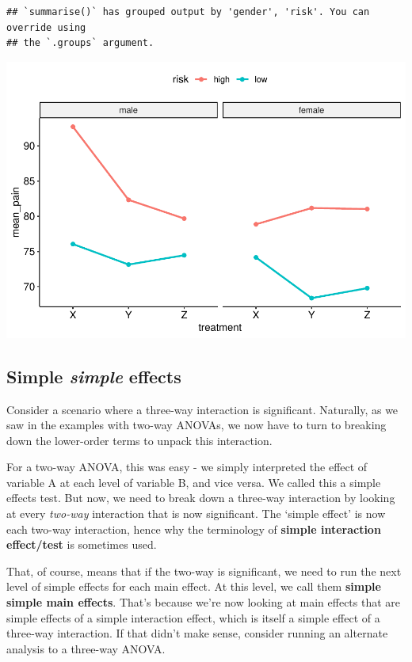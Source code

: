 \documentclass[
]{book}
\begin{document}
\begin{verbatim}
## `summarise()` has grouped output by 'gender', 'risk'. You can override using
## the `.groups` argument.
\end{verbatim}

\includegraphics{_main_files/figure-latex/unnamed-chunk-249-1.pdf}

\hypertarget{simple-simple-effects}{%
\subsection{\texorpdfstring{Simple \emph{simple} effects}{Simple simple effects}}\label{simple-simple-effects}}

Consider a scenario where a three-way interaction is significant. Naturally, as we saw in the examples with two-way ANOVAs, we now have to turn to breaking down the lower-order terms to unpack this interaction.

For a two-way ANOVA, this was easy - we simply interpreted the effect of variable A at each level of variable B, and vice versa. We called this a simple effects test. But now, we need to break down a three-way interaction by looking at every \emph{two-way} interaction that is now significant. The `simple effect' is now each two-way interaction, hence why the terminology of \textbf{simple interaction effect/test} is sometimes used.

That, of course, means that if the two-way is significant, we need to run the next level of simple effects for each main effect. At this level, we call them \textbf{simple simple main effects}. That's because we're now looking at main effects that are simple effects of a simple interaction effect, which is itself a simple effect of a three-way interaction. If that didn't make sense, consider running an alternate analysis to a three-way ANOVA.
\end{document}
